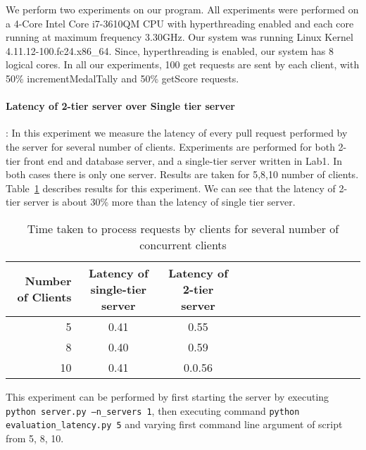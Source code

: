 \documentclass{article}
\begin{document}
We perform two experiments on our program. All experiments were performed
on a 4-Core Intel Core i7-3610QM CPU with hyperthreading enabled and each core
running at maximum frequency 3.30GHz. Our system was running Linux Kernel 
4.11.12-100.fc24.x86\_64. Since, hyperthreading is enabled, our system has 
8 logical cores. In all our experiments, 100 get requests are sent by
each client, with 50\% incrementMedalTally and 50\% getScore requests.

\paragraph{Latency of 2-tier server over Single tier server}:
In this experiment we measure the latency of every pull request 
performed by the server for several number of clients. Experiments are performed
for both 2-tier front end and database server, and a single-tier server written
in Lab1. In both cases there is only one server. 
Results are taken for 5,8,10 number of clients.
Table~\ref{tab:pull-request-latency} describes results for this experiment.
We can see that the latency of 2-tier server is about 30\% more than the 
latency of single tier server.
\begin{table}
    \small
\begin{tabularx}{\linewidth}{rccccccccccccc}
\toprule
Number of Clients&Latency of single-tier server&Latency of 2-tier server\\
\midrule
5&0.41&0.55&\\
8&0.40&0.59&\\
10&0.41&0.0.56&\\
\bottomrule
\end{tabularx}
\caption{Time taken to process requests by clients for several number of concurrent clients}
\label{tab:pull-request-latency}
\end{table}

This experiment can be performed by first starting the server by executing
{\tt python server.py --n\_servers 1}, then
executing command {\tt python evaluation\_latency.py 5}
and varying first command line argument of script from 5, 8, 10.
\end{document}
